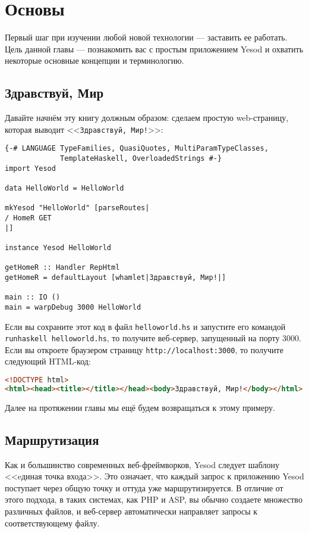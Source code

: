 \chapter{Основы}\label{ch:basics}

Первый шаг при изучении любой новой технологии --- заставить ее работать. Цель данной
главы --- познакомить вас с простым приложением Yesod и охватить некоторые основные
концепции и терминологию.

\section{Здравствуй, Мир}

Давайте начнём эту книгу должным образом: сделаем простую web-страницу, которая выводит
<<\texttt{Здравствуй, Мир!}>>:

\begin{lstlisting}
{-# LANGUAGE TypeFamilies, QuasiQuotes, MultiParamTypeClasses,
             TemplateHaskell, OverloadedStrings #-}
import Yesod

data HelloWorld = HelloWorld

mkYesod "HelloWorld" [parseRoutes|
/ HomeR GET
|]

instance Yesod HelloWorld

getHomeR :: Handler RepHtml
getHomeR = defaultLayout [whamlet|Здравствуй, Мир!|]

main :: IO ()
main = warpDebug 3000 HelloWorld
\end{lstlisting}

Если вы сохраните этот код в файл \lstinline!helloworld.hs! и запустите его командой
\lstinline!runhaskell helloworld.hs!, то получите веб-сервер, запущенный на порту 3000.
Если вы откроете браузером страницу \lstinline'http://localhost:3000', то получите
следующий HTML-код:

\begin{lstlisting}[language=HTML]
<!DOCTYPE html>
<html><head><title></title></head><body>Здравствуй, Мир!</body></html>
\end{lstlisting}

Далее на протяжении главы мы ещё будем возвращаться к этому примеру.

\section{Маршрутизация}

Как и большинство современных веб-фреймворков, Yesod следует шаблону <<eдиная точка
входа>>. Это означает, что каждый запрос к приложению Yesod поступает через общую точку и
оттуда уже маршрутизируется. В отличие от этого подхода, в таких системах, как PHP и ASP,
вы обычно создаете множество различных файлов, и веб-сервер автоматически направляет
запросы к соответствующему файлу.

